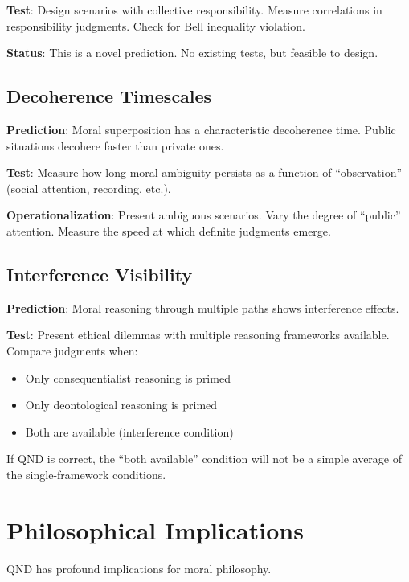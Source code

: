 \documentclass[12pt]{article}
\begin{document}
\textbf{Test}: Design scenarios with collective responsibility. Measure correlations in responsibility judgments. Check for Bell inequality violation.

\textbf{Status}: This is a novel prediction. No existing tests, but feasible to design.

\subsection{Decoherence Timescales}

\textbf{Prediction}: Moral superposition has a characteristic decoherence time. Public situations decohere faster than private ones.

\textbf{Test}: Measure how long moral ambiguity persists as a function of ``observation'' (social attention, recording, etc.).

\textbf{Operationalization}: Present ambiguous scenarios. Vary the degree of ``public'' attention. Measure the speed at which definite judgments emerge.

\subsection{Interference Visibility}

\textbf{Prediction}: Moral reasoning through multiple paths shows interference effects.

\textbf{Test}: Present ethical dilemmas with multiple reasoning frameworks available. Compare judgments when:
\begin{itemize}
    \item Only consequentialist reasoning is primed
    \item Only deontological reasoning is primed
    \item Both are available (interference condition)
\end{itemize}

If QND is correct, the ``both available'' condition will not be a simple average of the single-framework conditions.

\section{Philosophical Implications}

QND has profound implications for moral philosophy.
\end{document}
